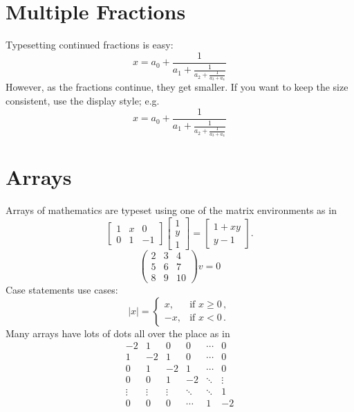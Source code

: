 \section{Multiple Fractions}
Typesetting continued fractions is easy:
\[
x = a_0 + \frac{1}{a_1 + \frac{1}{a_2 + \frac{1}{a_3 + a_4}}}
\]
However, as the fractions continue, they get smaller. If you want to keep the size consistent, use the display style; e.g.
\[
  x = a_0 + \frac{1}{\displaystyle a_1
          + \frac{1}{\displaystyle a_2
          + \frac{1}{\displaystyle a_3 + a_4}}}
\]
\section{Arrays}
Arrays of mathematics are typeset using one of the matrix environments as
in
\[
        \begin{bmatrix}
                1 & x & 0 \\
                0 & 1 & -1
        \end{bmatrix}\begin{bmatrix}
                1  \\
                y  \\
                1
        \end{bmatrix}
        =\begin{bmatrix}
                1+xy  \\
                y-1
        \end{bmatrix}.
\]
\[ \begin{pmatrix}
2 & 3 & 4\\
5 & 6 & 7\\
8 & 9 & 10 \end{pmatrix} v = 0 \]
Case statements use cases:
\[
        |x|=\begin{cases}
                x, & \text{if }x\geq 0\,,  \\
                -x, & \text{if }x< 0\,.
        \end{cases}
\]
Many arrays have lots of dots all over the place as in
\[
        \begin{matrix}
                -2 & 1 & 0 & 0 & \cdots & 0  \\
                1 & -2 & 1 & 0 & \cdots & 0  \\
                0 & 1 & -2 & 1 & \cdots & 0  \\
                0 & 0 & 1 & -2 & \ddots & \vdots \\
                \vdots & \vdots & \vdots & \ddots & \ddots & 1  \\
                0 & 0 & 0 & \cdots & 1 & -2
        \end{matrix}
\]
